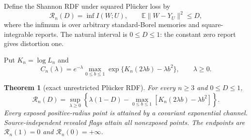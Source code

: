 \documentclass[11pt,a4paper]{article}
\newtheorem{theorem}{Theorem}[section]
\newcommand{\RDF}{\mathcal R}
\newcommand{\E}{\mathbb E}
\begin{document}
Define the Shannon RDF under squared Pl\"ucker loss by
\begin{equation}\label{eq:rdfdef}
 \RDF_n(D)=\inf I(W;U),
 \qquad \E\|W-Y_U\|^2\le D,
\end{equation}
where the infimum is over arbitrary standard-Borel memories and square-integrable reports.  The natural interval is $0\le D\le1$: the constant zero report gives distortion one.

Put $K_n=\log L_n$ and
\begin{equation}\label{eq:C}
 C_n(\lambda)=e^{-\lambda}
 \max_{0\le b\le1}\exp\{K_n(2\lambda b)-\lambda b^2\},
 \qquad \lambda\ge0.
\end{equation}

\begin{theorem}[exact unrestricted Pl\"ucker RDF]\label{thm:rdf}
For every $n\ge3$ and $0\le D\le1$,
\begin{equation}\label{eq:rdf}
 \boxed{
 \RDF_n(D)=\sup_{\lambda\ge0}
 \left\{\lambda(1-D)-
 \max_{0\le b\le1}[K_n(2\lambda b)-\lambda b^2]\right\}.}
\end{equation}
Every exposed positive-radius point is attained by a covariant exponential channel.  Source-independent revealed flags attain all nonexposed points.  The endpoints are $\RDF_n(1)=0$ and $\RDF_n(0)=+\infty$.
\end{theorem}
\end{document}
